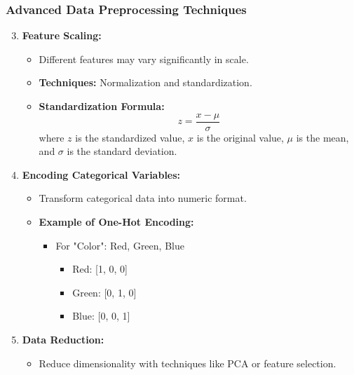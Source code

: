 \documentclass[aspectratio=169]{beamer}
\begin{document}
\begin{frame}[fragile]
    \frametitle{Advanced Data Preprocessing Techniques}
    \begin{enumerate}
        \setcounter{enumi}{2}
        \item \textbf{Feature Scaling:}
            \begin{itemize}
                \item Different features may vary significantly in scale.
                \item \textbf{Techniques:} Normalization and standardization.
                \item \textbf{Standardization Formula:}
                \begin{equation}
                    z = \frac{x - \mu}{\sigma}
                \end{equation}
                where \(z\) is the standardized value, \(x\) is the original value, \(\mu\) is the mean, and \(\sigma\) is the standard deviation.
            \end{itemize}

        \item \textbf{Encoding Categorical Variables:}
            \begin{itemize}
                \item Transform categorical data into numeric format.
                \item \textbf{Example of One-Hot Encoding:}
                    \begin{itemize}
                        \item For "Color": Red, Green, Blue
                            \begin{itemize}
                                \item Red: [1, 0, 0]
                                \item Green: [0, 1, 0]
                                \item Blue: [0, 0, 1]
                            \end{itemize}
                    \end{itemize}
            \end{itemize}
        
        \item \textbf{Data Reduction:}
            \begin{itemize}
                \item Reduce dimensionality with techniques like PCA or feature selection.
            \end{itemize}
    \end{enumerate}
\end{frame}
\end{document}
